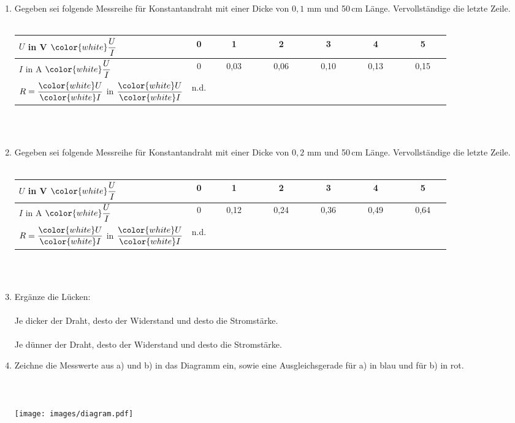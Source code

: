 \documentclass[task=1]{exercise}
\begin{document}
  \begin{enumerate}[label=\textnormal{\alph*)}]
   \item Gegeben sei folgende Messreihe für Konstantandraht mit einer Dicke von $0{,}1$ mm und 50\,cm Länge. Vervollständige die letzte Zeile.\\~\\
   \begin{tabular}{|l|c|c|c|c|c|c|}\hline
    $U$ in V  ${\color{white} \displaystyle\frac{U}{I}}$& 0 & 1 & 2 & 3 & 4 & 5 \\\hline
    $I$ in A  ${\color{white} \displaystyle\frac{U}{I}}$& 0 & 0,03 & 0,06 & 0,10 & 0,13 & 0,15 \\\hline
    $R = \displaystyle\frac{\color{white} U}{\color{white} I}$ in $\displaystyle\frac{\color{white} U}{\color{white} I}$ & n.d. & ~~~~~~~~~ & ~~~~~~~~~ & ~~~~~~~~~ & ~~~~~~~~~ & ~~~~~~~~~ \\\hline
   \end{tabular}~\\~\\
   \item Gegeben sei folgende Messreihe für Konstantandraht mit einer Dicke von $0{,}2$ mm und 50\,cm Länge. Vervollständige die letzte Zeile.\\~\\
   \begin{tabular}{|l|c|c|c|c|c|c|}\hline
    $U$ in V  ${\color{white} \displaystyle\frac{U}{I}}$& 0 & 1 & 2 & 3 & 4 & 5 \\\hline
    $I$ in A  ${\color{white} \displaystyle\frac{U}{I}}$& 0 & 0,12 & 0,24 & 0,36 & 0,49 & 0,64 \\\hline
    $R = \displaystyle\frac{\color{white} U}{\color{white} I}$ in $\displaystyle\frac{\color{white} U}{\color{white} I}$ & n.d. & ~~~~~~~~~ & ~~~~~~~~~ & ~~~~~~~~~ & ~~~~~~~~~ & ~~~~~~~~~ \\\hline
   \end{tabular}~\\~\\
   \item Ergänze die Lücken:\\~\\
   Je dicker der Draht, desto \luecke{3cm} der Widerstand und desto \luecke{3cm} die Stromstärke.\\~\\
   Je dünner der Draht, desto \luecke{3cm} der Widerstand und desto \luecke{3cm} die Stromstärke.
   \newpage
   \item Zeichne die Messwerte aus a) und b) in das Diagramm ein, sowie eine Ausgleichsgerade für a) in blau und für b) in rot.\\~\\~\\~\\
   \texttt{[image: images/diagram.pdf]}
  \end{enumerate}

  
\end{document}
